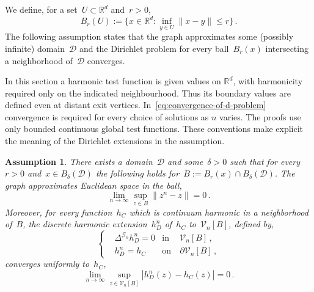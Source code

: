 \documentclass[12pt]{amsart}
\numberwithin{equation}{section}
\newtheorem{lemma}[theorem]{Lemma}
\newtheorem{assumptionD}{Assumption}
\newcommand*{\Rd}{\ensuremath{\mathbb{R}^d}}
\newcommand{\G}{\mathcal{G}}
\newcommand{\V}{\mathcal{V}}
\newcommand{\eps}{\varepsilon}
\begin{document}
 We define, for a set~$U \subset \Rd$ and~$r > 0$, 
\[
B_{r}(U) := \{ x \in \Rd : \inf_{y \in U}\| x - y\| \leq r\} \, . 
\]
 The following assumption states that the graph approximates some (possibly infinite) domain~$\mathcal{D}$ and the Dirichlet problem for every ball~$B_r(x)$ intersecting a neighborhood of~$\mathcal{D}$ converges. 
 
In this section a harmonic test function is given values on $\Rd$, with harmonicity required only on the indicated neighbourhood. Thus its boundary values are defined even at distant exit vertices. In~\eqref{eq:convergence-of-d-problem} convergence is required for every choice of solutions as $n$ varies. The proofs use only bounded continuous global test functions. These conventions make explicit the meaning of the Dirichlet extensions in the assumption.
\begin{assumptionD}
	\label{ass:D}
	{There exists a domain~$\mathcal{D}$ and some~$\delta > 0$ such that for every~$r > 0$ and~$x \in B_{\delta}(\mathcal{D})$ the following holds for~$B := B_r(x) \cap B_{\delta}(\mathcal{D})$.} The graph approximates Euclidean space in the ball, 
	\begin{equation}
		\label{eq:local-approximation-of-space}
	\lim_{n \to \infty} \sup_{z \in B} \| z^{n} - z\| = 0 \, . 
	\end{equation}
	Moreover, for every function~$h_C$ which is continuum harmonic in a neighborhood of~$B$, the discrete
	harmonic extension~$h^{n}_D$ of~$h_C$ to~$\V_n[B]$, defined by, 
	\[
	\left\{
	\begin{aligned}
		&  \Delta^{\G_n} h^{n}_D = 0 & \mbox{in} & \ \V_n[B] \,,
		\\
		& h^{n}_D = h_C & \mbox{on} &  \ \partial \V_n[B]    \, ,
	\end{aligned}
	\right.
	\]
	converges uniformly to~$h_C$,
	\begin{equation}
		\label{eq:convergence-of-d-problem}
	\lim_{n \to \infty} \sup_{z \in \V_n[B]} |h^{n}_D(z) - h_C(z)|  = 0 \, . 
	\end{equation}
\end{assumptionD}

\end{document}
